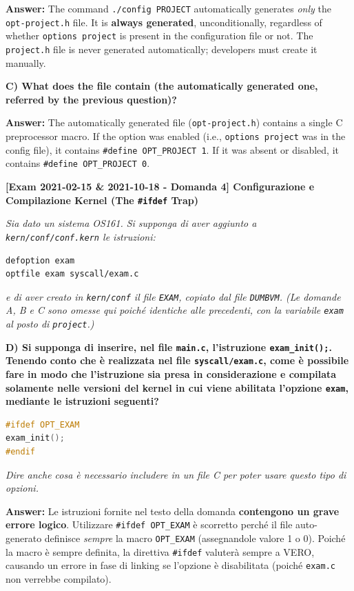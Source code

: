 \textbf{Answer:} 
The command \texttt{./config PROJECT} automatically generates \textit{only} the \texttt{opt-project.h} file. It is \textbf{always generated}, unconditionally, regardless of whether \texttt{options project} is present in the configuration file or not. The \texttt{project.h} file is never generated automatically; developers must create it manually.

\textbf{C) What does the file contain (the automatically generated one, referred by the previous question)?}

\textbf{Answer:} 
The automatically generated file (\texttt{opt-project.h}) contains a single C preprocessor macro. If the option was enabled (i.e., \texttt{options project} was in the config file), it contains \texttt{\#define OPT\_PROJECT 1}. If it was absent or disabled, it contains \texttt{\#define OPT\_PROJECT 0}.

\vspace{1em}

\textbf{[Exam 2021-02-15 \& 2021-10-18 - Domanda 4] Configurazione e Compilazione Kernel (The \texttt{\#ifdef} Trap)}

\textit{Sia dato un sistema OS161. Si supponga di aver aggiunto a \texttt{kern/conf/conf.kern} le istruzioni:}
\begin{verbatim}
defoption exam
optfile exam syscall/exam.c
\end{verbatim}
\textit{e di aver creato in \texttt{kern/conf} il file \texttt{EXAM}, copiato dal file \texttt{DUMBVM}. (Le domande A, B e C sono omesse qui poiché identiche alle precedenti, con la variabile \texttt{exam} al posto di \texttt{project}.)}

\textbf{D) Si supponga di inserire, nel file \texttt{main.c}, l’istruzione \texttt{exam\_init();}. Tenendo conto che è realizzata nel file \texttt{syscall/exam.c}, come è possibile fare in modo che l’istruzione sia presa in considerazione e compilata solamente nelle versioni del kernel in cui viene abilitata l’opzione \texttt{exam}, mediante le istruzioni seguenti?}
\begin{lstlisting}[language=C]
#ifdef OPT_EXAM
exam_init();
#endif
\end{lstlisting}
\textit{Dire anche cosa è necessario includere in un file C per poter usare questo tipo di opzioni.}

\textbf{Answer:} 
Le istruzioni fornite nel testo della domanda \textbf{contengono un grave errore logico}. Utilizzare \texttt{\#ifdef OPT\_EXAM} è scorretto perché il file auto-generato definisce \textit{sempre} la macro \texttt{OPT\_EXAM} (assegnandole valore 1 o 0). Poiché la macro è sempre definita, la direttiva \texttt{\#ifdef} valuterà sempre a VERO, causando un errore in fase di linking se l'opzione è disabilitata (poiché \texttt{exam.c} non verrebbe compilato).

